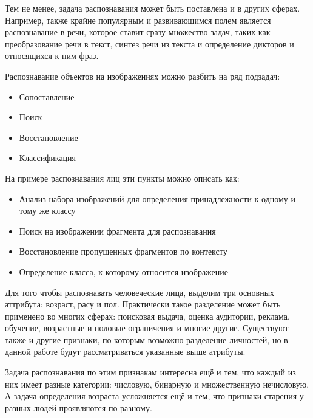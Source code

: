 \documentclass[12pt,a4paper]{article}
\begin{document}
Тем не менее, задача распознавания может быть поставлена и в других сферах. Например, также крайне популярным и развивающимся полем является распознавание в речи, которое ставит сразу множество задач, таких как преобразование речи в текст, синтез речи из текста и определение дикторов и относящихся к ним фраз.

Распознавание объектов на изображениях можно разбить на ряд подзадач:
\begin{itemize}
    \item Сопоставление
    \item Поиск
    \item Восстановление
    \item Классификация
\end{itemize}

На примере распознавания лиц эти пункты можно описать как:
\begin{itemize}
    \item Анализ набора изображений для определения принадлежности к одному и тому же классу
    \item Поиск на изображении фрагмента для распознавания
    \item Восстановление пропущенных фрагментов по контексту
    \item Определение класса, к которому относится изображение
\end{itemize}

Для того чтобы распознавать человеческие лица, выделим три основных аттрибута: возраст, расу и пол. Практически такое разделение может быть применено во многих сферах: поисковая выдача, оценка аудитории, реклама, обучение, возрастные и половые ограничения и многие другие. Существуют также и другие признаки, по которым возможно разделение личностей, но в данной работе будут рассматриваться указанные выше атрибуты.

Задача распознавания по этим признакам интересна ещё и тем, что каждый из них имеет разные категории: числовую, бинарную и множественную нечисловую. А задача определения возраста усложняется ещё и тем, что признаки старения у разных людей проявляются по-разному.
\end{document}
